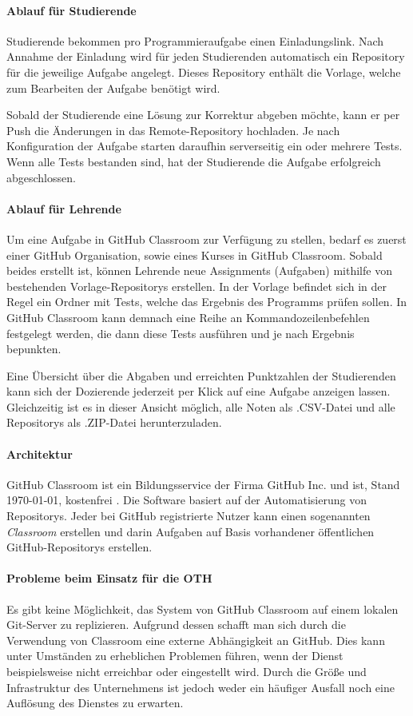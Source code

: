 \paragraph{Ablauf für Studierende}
Studierende bekommen pro Programmieraufgabe einen Einladungslink. Nach Annahme
der Einladung wird für jeden Studierenden automatisch ein Repository für die
jeweilige Aufgabe angelegt. Dieses Repository enthält die Vorlage, welche zum
Bearbeiten der Aufgabe benötigt wird.

Sobald der Studierende eine Lösung zur Korrektur abgeben möchte, kann er per
Push die Änderungen in das Remote-Repository hochladen. Je nach Konfiguration
der Aufgabe starten daraufhin serverseitig ein oder mehrere Tests. Wenn alle
Tests bestanden sind, hat der Studierende die Aufgabe erfolgreich abgeschlossen.

\paragraph{Ablauf für Lehrende}
Um eine Aufgabe in GitHub Classroom zur Verfügung zu stellen, bedarf es zuerst
einer GitHub Organisation, sowie eines Kurses in GitHub Classroom. Sobald beides
erstellt ist, können Lehrende neue Assignments (Aufgaben) mithilfe von
bestehenden Vorlage-Repositorys erstellen. In der Vorlage befindet sich in der
Regel ein Ordner mit Tests, welche das Ergebnis des Programms prüfen sollen.
In GitHub Classroom kann demnach eine Reihe an Kommandozeilenbefehlen festgelegt
werden, die dann diese Tests ausführen und je nach Ergebnis bepunkten.

Eine Übersicht über die Abgaben und erreichten Punktzahlen der Studierenden kann
sich der Dozierende jederzeit per Klick auf eine Aufgabe anzeigen lassen.
Gleichzeitig ist es in dieser Ansicht möglich, alle Noten als .CSV-Datei und
alle Repositorys als .ZIP-Datei herunterzuladen.

\paragraph{Architektur}
GitHub Classroom ist ein Bildungsservice der Firma GitHub Inc. und ist, Stand
\today, kostenfrei \parencite{github-classroom-kostenlos}. Die Software basiert
auf der Automatisierung von Repositorys. Jeder bei GitHub registrierte Nutzer
kann einen sogenannten \emph{Classroom} erstellen und darin Aufgaben auf
Basis vorhandener öffentlichen GitHub-Repositorys erstellen.

\paragraph{Probleme beim Einsatz für die OTH}
Es gibt keine Möglichkeit, das System von GitHub Classroom auf einem lokalen
Git-Server zu replizieren. Aufgrund dessen schafft man sich durch die
Verwendung von Classroom eine externe Abhängigkeit an GitHub. Dies kann unter
Umständen zu erheblichen Problemen führen, wenn der Dienst beispielsweise
nicht erreichbar oder eingestellt wird. Durch die Größe und Infrastruktur des
Unternehmens ist jedoch weder ein häufiger Ausfall noch eine Auflösung des
Dienstes zu erwarten.

